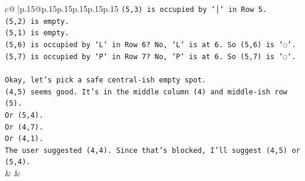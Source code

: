 \documentclass{article}
\begin{document}
{\begin{supertabular}{c@{$\;$}|p{.15\linewidth}@{}p{.15\linewidth}p{.15\linewidth}p{.15\linewidth}p{.15\linewidth}p{.15\linewidth}}
{{{\texttt{(5,3) is occupied by `│` in Row 5.} \\
\texttt{(5,2) is empty.} \\
\texttt{(5,1) is empty.} \\
\texttt{(5,6) is occupied by `L` in Row 6? No, `L` is at 6. So (5,6) is `◌`.} \\
\texttt{(5,7) is occupied by `P` in Row 7? No, `P` is at 6. So (5,7) is `◌`.} \\
\\ 
\texttt{Okay, let's pick a safe central{-}ish empty spot.} \\
\texttt{(4,5) seems good. It's in the middle column (4) and middle{-}ish row (5).} \\
\texttt{Or (5,4).} \\
\texttt{Or (4,7).} \\
\texttt{Or (4,1).} \\
\texttt{The user suggested (4,4). Since that's blocked, I'll suggest (4,5) or (5,4).} \\
            }
        }
    }
    & & \\ \\


\end{supertabular}}
\end{document}
